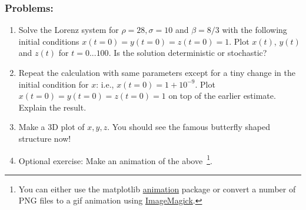  \subsubsection{Problems:}
 \begin{enumerate}
 \item Solve the Lorenz system for $\rho = 28, \sigma = 10$ and $\beta = 8/3$ with the following initial conditions $x(t = 0) = y(t = 0) = z(t=0) = 1$. Plot $x(t)$, $y(t)$ and $z(t)$ for $t = 0 ... 100$. Is the solution deterministic or stochastic? 
 \item Repeat the calculation with same parameters except for a tiny change in the initial condition for $x$: i.e., $x(t = 0) = 1 + 10^{-9}$. Plot  $x(t = 0) = y(t = 0) = z(t=0) = 1$ on top of the earlier estimate. Explain the result. 
 \item Make a 3D plot of $x, y, z$. You should see the famous butterfly shaped structure now! 
 \item Optional exercise: Make an animation of the above~\footnote{You can either use the matplotlib \href{http://matplotlib.org/api/animation_api.html}{animation} package or convert a number of PNG files to a gif animation using \href{http://www.imagemagick.org/Usage/anim_basics/}{ImageMagick}.}. 
 \end{enumerate}
 

